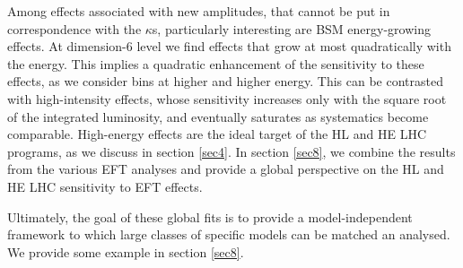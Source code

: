 Among effects associated with new amplitudes, that cannot be put in correspondence with the $\kappa$s, particularly interesting are BSM energy-growing effects. At dimension-6 level we find effects that grow at most quadratically with the energy. This implies a quadratic enhancement of the sensitivity to these effects, as we consider bins at higher and higher energy. 
 This can be contrasted with high-intensity effects, whose sensitivity increases only with the square root of the integrated luminosity, and eventually saturates as systematics become comparable. High-energy effects are the ideal target of the HL and HE LHC programs, as we discuss in section \ref{sec4}.
 In section \ref{sec8}, we combine the results from the various EFT analyses and provide a global perspective on the HL and HE LHC sensitivity to EFT effects. 

Ultimately, the goal of these global fits is to provide a model-independent framework to which large classes of specific models can be matched an analysed. We provide some example in section \ref{sec8}.



